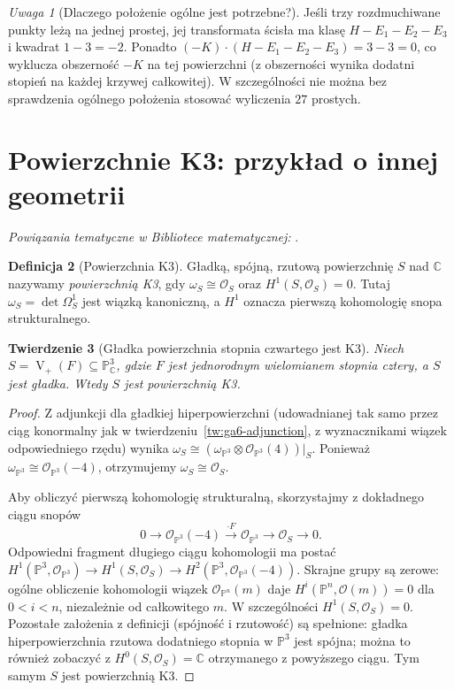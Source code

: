 \documentclass[11pt,a4paper,openany]{report}
\numberwithin{equation}{section}
\theoremstyle{plain}
\newtheorem{twierdzenie}{Twierdzenie}[section]
\theoremstyle{definition}
\newtheorem{definicja}[twierdzenie]{Definicja}
\theoremstyle{remark}
\newtheorem{uwaga}[twierdzenie]{Uwaga}
\newcommand{\C}{\mathbb C}
\newcommand{\PP}{\mathbb P}
\newcommand{\V}{\operatorname V}
\begin{document}
\begin{uwaga}[Dlaczego położenie ogólne jest potrzebne?]
Jeśli trzy rozdmuchiwane punkty leżą na jednej prostej,
jej transformata ścisła ma klasę $H-E_1-E_2-E_3$
i kwadrat $1-3=-2$. Ponadto
$(-K)\cdot(H-E_1-E_2-E_3)=3-3=0$,
co wyklucza obszerność $-K$ na tej powierzchni
(z obszerności wynika dodatni stopień na każdej
krzywej całkowitej). W szczególności nie można
bez sprawdzenia ogólnego położenia stosować
wyliczenia $27$ prostych.
\end{uwaga}

\section{Powierzchnie K3: przykład o innej geometrii}
\label{sec:ga6-k3}

\noindent\emph{Powiązania tematyczne w Bibliotece matematycznej:} .


\begin{definicja}[Powierzchnia K3]
Gładką, spójną, rzutową powierzchnię $S$ nad $\C$
nazywamy \emph{powierzchnią K3}, gdy
$\omega_S\cong\mathcal O_S$ oraz
$H^1(S,\mathcal O_S)=0$. Tutaj
$\omega_S=\det\Omega_S^1$ jest wiązką kanoniczną,
a $H^1$ oznacza pierwszą kohomologię snopa strukturalnego.
\end{definicja}

\begin{twierdzenie}[Gładka powierzchnia stopnia czwartego jest K3]
\label{tw:ga6-quartic-k3}
Niech $S=\V_+(F)\subseteq\PP^3_\C$, gdzie $F$
jest jednorodnym wielomianem stopnia cztery, a $S$
jest gładka. Wtedy $S$ jest powierzchnią K3.
\end{twierdzenie}
\begin{proof}
Z adjunkcji dla gładkiej hiperpowierzchni
(udowadnianej tak samo przez ciąg konormalny jak
w twierdzeniu~\ref{tw:ga6-adjunction}, z wyznacznikami
wiązek odpowiedniego rzędu) wynika
$\omega_S\cong(\omega_{\PP^3}\otimes
\mathcal O_{\PP^3}(4))|_S$.
Ponieważ $\omega_{\PP^3}\cong\mathcal O_{\PP^3}(-4)$,
otrzymujemy $\omega_S\cong\mathcal O_S$.

Aby obliczyć pierwszą kohomologię strukturalną,
skorzystajmy z dokładnego ciągu snopów
\[
0\longrightarrow\mathcal O_{\PP^3}(-4)
\xrightarrow{\cdot F}\mathcal O_{\PP^3}
\longrightarrow\mathcal O_S\longrightarrow0.
\]
Odpowiedni fragment długiego ciągu kohomologii ma postać
$H^1(\PP^3,\mathcal O_{\PP^3})\to
H^1(S,\mathcal O_S)\to
H^2(\PP^3,\mathcal O_{\PP^3}(-4))$.
Skrajne grupy są zerowe: ogólne obliczenie kohomologii
wiązek $\mathcal O_{\PP^n}(m)$ daje
$H^i(\PP^n,\mathcal O(m))=0$ dla $0<i<n$,
niezależnie od całkowitego $m$. W szczególności
$H^1(S,\mathcal O_S)=0$.
Pozostałe założenia z definicji (spójność i
rzutowość) są spełnione: gładka hiperpowierzchnia
rzutowa dodatniego stopnia w $\PP^3$ jest spójna;
można to również zobaczyć z
$H^0(S,\mathcal O_S)=\C$ otrzymanego z powyższego
ciągu. Tym samym $S$ jest powierzchnią K3.
\end{proof}
\end{document}
